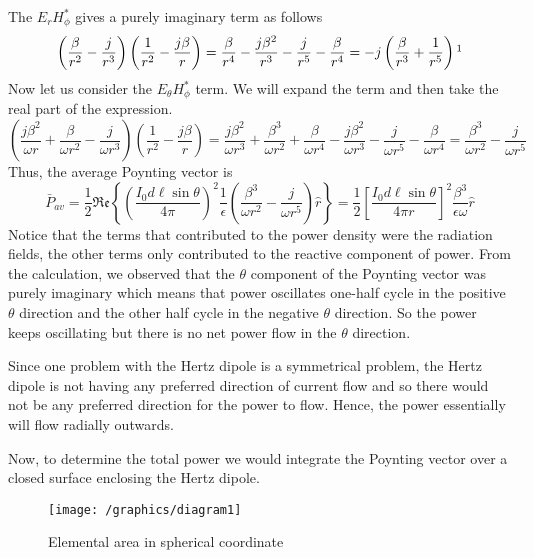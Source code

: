 The $E_rH_\phi^\ast$ gives a purely imaginary term as follows
\begin{dmath*}
\left(\dfrac{\beta}{r^2} - \frac{j}{r^3}\right)\left(\frac{1}{r^2} 
- \frac{j\beta}{r}\right)
=  \frac{\beta}{r^4} - \frac{j\beta^2}{r^3} 
- \frac{j}{r^5} - \frac{\beta}{r^4}
= -j\left( \frac{\beta}{r^3}  +  \frac{1}{r^5}\right)\footnotemark
\end{dmath*}
Now let us consider the $E_\theta H_\phi^\ast$ term. We will expand the term and then take the real part of the expression.
\begin{dmath*}
\left(\frac{j\beta^2}{\omega r} + \frac{\beta}{\omega r^2} - \frac{j}{\omega r^3}\right)\left(\frac{1}{r^2} - \frac{j\beta}{r}\right)
=\frac{j\beta^2}{\omega r^3} 
+ \frac{\beta^3}{\omega r^2} + \frac{\beta}{\omega r^4} 
- \frac{j\beta^2}{\omega r^3} - \frac{j}{\omega r^5}
- \frac{\beta}{\omega r^4}
=\frac{\beta^3}{\omega r^2} - \frac{j}{\omega r^5}
\end{dmath*}
Thus, the average Poynting vector is
\begin{dmath*}
\bar{P}_{av} = \frac{1}{2}\mathfrak{Re}\left\{\left(\frac{I_0 d\ell\sin\theta}{4\pi}\right)^2\frac{1}{\epsilon} \left(\frac{\beta^3}{\omega r^2} - \frac{j}{\omega r^5}\right)\hat{r}\right\}
= \frac{1}{2}
\left[\frac{I_0 d\ell\sin\theta}{4\pi r}\right]^2 \frac{\beta^3}{\epsilon\omega}\hat{r} 
\end{dmath*}
Notice that the terms that contributed to the power density were the radiation fields, the other terms only contributed to the reactive component of power. From the calculation, we observed that the $\theta$  component of the Poynting vector was purely imaginary which means that power oscillates one-half cycle in the positive $\theta$ direction and the other half cycle in the negative $\theta$ direction. So the power keeps oscillating but there is no net power flow in the $\theta$ direction.

Since one problem with the Hertz dipole is a symmetrical problem, the Hertz dipole is not having any preferred direction of current flow and so there would not be any preferred direction for the power to flow. Hence, the power essentially will flow radially outwards.

Now, to determine the total power we would integrate the Poynting vector over a closed surface enclosing the Hertz dipole.
\begin{figure}[h]
\centering
\texttt{[image: /graphics/diagram1]}
\caption{Elemental area in spherical coordinate}
\label{fig:diagram1}
\end{figure}


